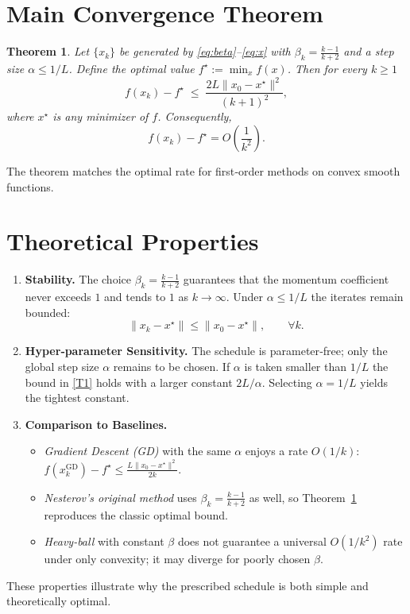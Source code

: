 \documentclass{article}
\newtheorem{theorem}{Theorem}
\begin{document}
\section*{Main Convergence Theorem}
\begin{theorem}\label{thm:rate}
Let \(\{x_k\}\) be generated by \eqref{eq:beta}--\eqref{eq:x} with \(\beta_k=\frac{k-1}{k+2}\) and a step size \(\alpha\le 1/L\).  
Define the optimal value \(f^\star:=\min_{x}f(x)\). Then for every \(k\ge 1\)
\[
f(x_k)-f^\star\;\le\;\frac{2L\|x_0-x^\star\|^{2}}{(k+1)^{2}},
\tag{T1}
\]
where \(x^\star\) is any minimizer of \(f\). Consequently,
\[
f(x_k)-f^\star = O\!\left(\frac{1}{k^{2}}\right).
\]
\end{theorem}
The theorem matches the optimal rate for first‑order methods on convex smooth functions.

\section*{Theoretical Properties}
\begin{enumerate}[label=\arabic*.]
\item \textbf{Stability.} The choice \(\beta_k=\frac{k-1}{k+2}\) guarantees that the momentum coefficient never exceeds \(1\) and tends to \(1\) as \(k\to\infty\). Under \(\alpha\le 1/L\) the iterates remain bounded:
\[
\|x_k-x^\star\|\le \|x_0-x^\star\|,\qquad \forall k.
\]

\item \textbf{Hyper‑parameter Sensitivity.} The schedule is parameter‑free; only the global step size \(\alpha\) remains to be chosen. If \(\alpha\) is taken smaller than \(1/L\) the bound in \eqref{T1} holds with a larger constant \(2L/\alpha\). Selecting \(\alpha=1/L\) yields the tightest constant.

\item \textbf{Comparison to Baselines.}  
\begin{itemize}
\item \emph{Gradient Descent (GD)} with the same \(\alpha\) enjoys a rate \(O(1/k)\): \(f(x_k^{\text{GD}})-f^\star\le \frac{L\|x_0-x^\star\|^2}{2k}\).  
\item \emph{Nesterov’s original method} uses \(\beta_k=\frac{k-1}{k+2}\) as well, so Theorem~\ref{thm:rate} reproduces the classic optimal bound.  
\item \emph{Heavy‑ball} with constant \(\beta\) does not guarantee a universal \(O(1/k^2)\) rate under only convexity; it may diverge for poorly chosen \(\beta\).
\end{itemize}
\end{enumerate}
These properties illustrate why the prescribed schedule is both simple and theoretically optimal.
\end{document}
